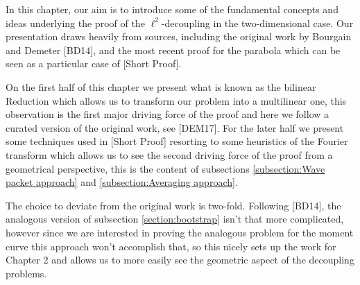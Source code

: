 In this chapter, our aim is to introduce some of the fundamental concepts and ideas underlying the proof of the $\ell^2$-decoupling in the two-dimensional case.
Our presentation draws heavily from sources, including the original work by Bourgain and Demeter [BD14], and the most recent proof for the parabola which can be seen as a particular case of [Short Proof].

On the first half of this chapter we present what is known as the bilinear Reduction which allows us to transform our problem into a multilinear one, this observation is the first major driving force of the proof and here we follow a curated 
version of the original work, see [DEM17]. For the later half we present some techniques used in [Short Proof] resorting to some heuristics of the Fourier transform which allows us to see the second driving force of the proof from a geometrical 
perspective, this is the content of subsections \ref{subsection:Wave packet approach} and \ref{subsection:Averaging approach}.

The choice to deviate from the original work is two-fold. Following [BD14], the analogous version of subsection \ref{section:bootstrap} isn't that more complicated, however since we are interested in proving the analogous problem for the moment 
curve this approach won't accomplish that, so this nicely sets up the work for Chapter 2 and allows us to more easily see the geometric aspect of the decoupling problems.

\newpage
